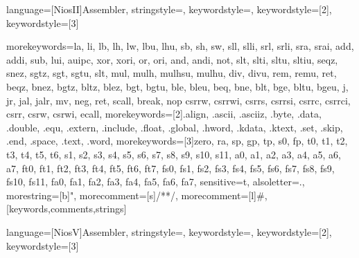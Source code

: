    
    {
   language=[NiosII]{Assembler},
   stringstyle=\color{niosStringColour},
   keywordstyle=\color{niosInstructionColour},
   keywordstyle=[2]\color{niosDirectiveColour},
   keywordstyle=[3]\itshape\color{niosSpecialRegColour}
   }

 {
 	morekeywords={la, li, lb, lh, lw, lbu, lhu, sb, sh, sw, sll, slli, srl, srli, sra, srai,
    add, addi, sub, lui, auipc, xor, xori, or, ori, and, andi, not, slt, slti, sltu, sltiu,
    seqz, snez, sgtz, sgt, sgtu, slt, mul, mulh, mulhsu, mulhu, div, divu, rem, remu,
    ret, beqz, bnez, bgtz, bltz, blez, bgt, bgtu, ble, bleu,
    beq, bne, blt, bge, bltu, bgeu, j, jr, jal, jalr, mv, neg, ret, scall, break, nop
    csrrw, csrrwi, csrrs, csrrsi, csrrc, csrrci, csrr, csrw, csrwi, ecall},%
 	morekeywords=[2]{.align, .ascii, .asciiz, .byte, .data, .double, .equ, .extern, .include,
    .float, .global, .hword, .kdata, .ktext, .set, .skip, .end, .space, .text, .word},%
 	morekeywords=[3]{zero, ra, sp, gp, tp, s0, fp, t0, t1, t2, t3, t4, t5, t6,
    s1, s2, s3, s4, s5, s6, s7, s8, s9, s10, s11, a0, a1, a2, a3, a4, a5, a6, a7,
    ft0, ft1, ft2, ft3, ft4, ft5, ft6, ft7, fs0, fs1, fs2, fs3, fs4, fs5, fs6, fs7, 
    fs8, fs9, fs10, fs11, fa0, fa1, fa2, fa3, fa4, fa5, fa6, fa7},%
 	sensitive=t,%
 	alsoletter=.,%
	morestring=[b]",%
 	morecomment=[s]{/*}{*/},%
 	morecomment=[l]\#,%
   }[keywords,comments,strings]
   
   
   
    {
   language=[NiosV]{Assembler},
   stringstyle=\color{niosVStringColour},
   keywordstyle=\color{niosVInstructionColour},
   keywordstyle=[2]\color{niosVDirectiveColour},
   keywordstyle=[3]\itshape\color{niosVSpecialRegColour}
   }

